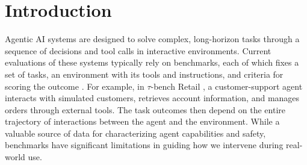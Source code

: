 \section{Introduction}
\label{sec:introduction}


Agentic AI systems are designed to solve complex, long-horizon tasks through a sequence of decisions and tool calls in interactive environments.
Current evaluations of these systems typically rely on benchmarks, each of which fixes a set of tasks, an environment with its tools and instructions, and criteria for scoring the outcome \citep{jimenez2024swebench,zhou2024webarena,liu2024agentbench,yao2025tau,barres2025tau2}.
For example, in $\tau$-bench Retail \citep{yao2025tau}, a customer-support agent interacts with simulated customers, retrieves account information, and manages orders through external tools.
The task outcomes then depend on the entire trajectory of interactions between the agent and the environment.
While a valuable source of data for characterizing agent capabilities and safety, benchmarks have significant limitations in guiding how we intervene during real-world use.


